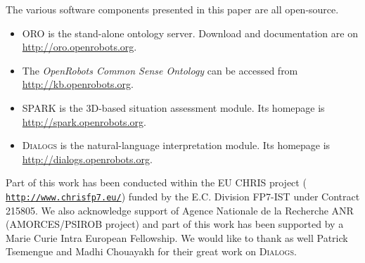 \documentclass[twocolumn]{svjour3}
\begin{document}
The various software components presented in this paper are all open-source.

\begin{itemize}
\item \textsc{ORO} is the stand-alone ontology server. Download and 
documentation are on \url{http://oro.openrobots.org}.
\item The \emph{OpenRobots Common Sense Ontology} can be accessed from
\url{http://kb.openrobots.org}.
\item \textsc{SPARK} is the 3D-based situation assessment module. Its homepage
is \url{http://spark.openrobots.org}.  
\item \textsc{Dialogs} is the natural-language interpretation module. Its
homepage is \url{http://dialogs.openrobots.org}. 
\end{itemize}

\begin{acknowledgements} 

Part of this work has been conducted within the EU CHRIS project ({\tt
\url{http://www.chrisfp7.eu/}}) funded by the E.C. Division FP7-IST under
Contract 215805. We also acknowledge support of Agence Nationale de la
Recherche ANR (AMORCES/PSIROB project) and part of this work has been supported
by a Marie Curie Intra European Fellowship. We would like to thank as well
Patrick Tsemengue and Madhi Chouayakh for their great work on \textsc{Dialogs}.

\end{acknowledgements}






\end{document}
